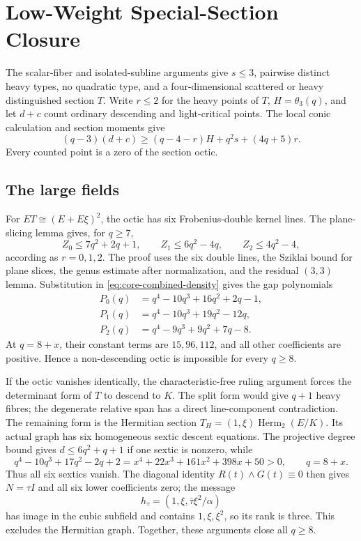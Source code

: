 \documentclass[12pt,letterpaper,onecolumn]{article}
\theoremstyle{definition}
\theoremstyle{remark}
\begin{document}
\section{Low-Weight Special-Section Closure}
The scalar-fiber and isolated-subline arguments give \(s\le3\), pairwise
distinct heavy types, no quadratic type, and a four-dimensional scattered
or heavy distinguished section \(T\).  Write \(r\le2\) for the heavy points
of \(T\), \(H=\theta_3(q)\), and let \(d+c\) count ordinary descending and
light-critical points.  The local conic calculation and section moments give
\begin{equation}\label{eq:core-combined-density}
(q-3)(d+c)\ge(q-4-r)H+q^2s+(4q+5)r.
\end{equation}
Every counted point is a zero of the section octic.

\subsection{The large fields}
For \(ET\cong(E+E\xi)^2\), the octic has six Frobenius-double kernel lines.
The plane-slicing lemma gives, for \(q\ge7\),
\[
Z_0\le7q^2+2q+1,\qquad
Z_1\le6q^2-4q,\qquad
Z_2\le4q^2-4,
\]
according as \(r=0,1,2\).  The proof uses the six double lines, the
Sziklai bound for plane slices, the genus estimate after normalization, and
the residual \((3,3)\) lemma.  Substitution in
\eqref{eq:core-combined-density} gives the gap polynomials
\[
\begin{aligned}
P_0(q)&=q^4-10q^3+16q^2+2q-1,\\
P_1(q)&=q^4-10q^3+19q^2-12q,\\
P_2(q)&=q^4-9q^3+9q^2+7q-8.
\end{aligned}
\]
At \(q=8+x\), their constant terms are \(15,96,112\), and all other
coefficients are positive.  Hence a non-descending octic is impossible for
every \(q\ge8\).

If the octic vanishes identically, the characteristic-free ruling argument
forces the determinant form of \(T\) to descend to \(K\).  The split form
would give \(q+1\) heavy fibres; the degenerate relative span has a direct
line-component contradiction.  The remaining form is the Hermitian section
\(T_H=(1,\xi)\operatorname{Herm}_2(E/K)\).  Its actual graph has six
homogeneous sextic descent equations.  The projective degree bound gives
\(d\le6q^2+q+1\) if one sextic is nonzero, while
\[
q^4-10q^3+17q^2-2q+2
=x^4+22x^3+161x^2+398x+50>0,\qquad q=8+x.
\]
Thus all six sextics vanish.  The diagonal identity
\(R(t)\wedge G(t)\equiv0\) then gives \(N=\tau I\) and all six lower
coefficients zero; the message
\[
h_\tau=(1,\xi,\bar\tau\xi^2/\alpha)
\]
has image in the cubic subfield and contains \(1,\xi,\xi^2\), so its rank is
three.  This excludes the Hermitian graph.  Together, these arguments close
all \(q\ge8\).
\end{document}
